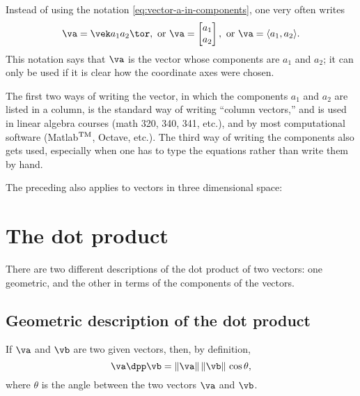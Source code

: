 \noindent%
Instead of using the notation \eqref{eq:vector-a-in-components}, one very often
writes
\begin{equation}
  \va = \vek a_1 \\ a_2 \tor,
  \text{ or }
  \va = \begin{bmatrix}
    a_1 \\ a_2
  \end{bmatrix}, \text{ or } \va = \langle a_1, a_2\rangle.
  \label{eq:vector-a-as-column-vector}
\end{equation}
This notation says that $\va$ is the vector whose components are $a_1$ and $a_2$; it
can only be used if it is clear how the coordinate axes were chosen.

The first two ways of writing the vector, in which the components
$a_1$ and $a_2$ are listed in a column, is the standard way of writing
``column vectors,'' and is used in linear algebra courses (math 320,
340, 341, etc.), and by most computational software (Matlab$^{\rm
  TM}$, Octave, etc.).  The third way of writing the components also
gets used, especially when one has to type the equations rather than
write them by hand.

The preceding also applies to vectors in three dimensional space:
\begin{figure}[h]\sffamily\color{darkbluegreen}
  
\end{figure}

\section{The dot product} %
There are two different descriptions of the dot product of two
vectors: one geometric, and the other in terms of the components of
the vectors.

\subsection{Geometric description of the dot product}
If $\va$ and $\vb$ are two given vectors, then, by definition,
\begin{equation}
  \label{eq:dotproduct-geometric}
  \va\dpp\vb = \|\va\| \, \|\vb\|\,\cos \theta,
\end{equation}
where $\theta$ is the angle between the two vectors $\va$ and $\vb$.

